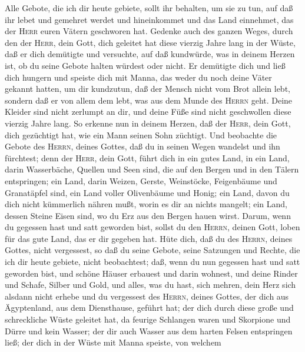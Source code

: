  Alle Gebote, die ich dir heute gebiete, sollt ihr
behalten, um sie zu tun, auf daß ihr lebet und gemehret werdet und
hineinkommet und das Land einnehmet, das der \textsc{Herr} euren Vätern
geschworen hat.  Gedenke auch des ganzen Weges, durch den
der \textsc{Herr}, dein Gott, dich geleitet hat diese vierzig Jahre lang
in der Wüste, daß er dich demütigte und versuchte, auf daß kundwürde,
was in deinem Herzen ist, ob du seine Gebote halten würdest oder nicht.
 Er demütigte dich und ließ dich hungern und speiste dich
mit Manna, das weder du noch deine Väter gekannt hatten, um dir
kundzutun, daß der Mensch nicht vom Brot allein lebt, sondern daß er von
allem dem lebt, was aus dem Munde des \textsc{Herrn} geht.
 Deine Kleider sind nicht zerlumpt an dir, und deine Füße
sind nicht geschwollen diese vierzig Jahre lang.  So
erkenne nun in deinem Herzen, daß der \textsc{Herr}, dein Gott, dich
gezüchtigt hat, wie ein Mann seinen Sohn züchtigt.  Und
beobachte die Gebote des \textsc{Herrn}, deines Gottes, daß du in seinen
Wegen wandelst und ihn fürchtest;  denn der \textsc{Herr},
dein Gott, führt dich in ein gutes Land, in ein Land, darin Wasserbäche,
Quellen und Seen sind, die auf den Bergen und in den Tälern entspringen;
 ein Land, darin Weizen, Gerste, Weinstöcke, Feigenbäume
und Granatäpfel sind, ein Land voller Olivenbäume und Honig;
 ein Land, davon du dich nicht kümmerlich nähren mußt,
worin es dir an nichts mangelt; ein Land, dessen Steine Eisen sind, wo
du Erz aus den Bergen hauen wirst.  Darum, wenn du
gegessen hast und satt geworden bist, sollst du den \textsc{Herrn},
deinen Gott, loben für das gute Land, das er dir gegeben hat.
 Hüte dich, daß du des \textsc{Herrn}, deines Gottes,
nicht vergessest, so daß du seine Gebote, seine Satzungen und Rechte,
die ich dir heute gebiete, nicht beobachtest;  daß, wenn
du nun gegessen hast und satt geworden bist, und schöne Häuser erbauest
und darin wohnest,  und deine Rinder und Schafe, Silber
und Gold, und alles, was du hast, sich mehren,  dein Herz
sich alsdann nicht erhebe und du vergessest des \textsc{Herrn}, deines
Gottes, der dich aus Ägyptenland, aus dem Diensthause, geführt hat;
 der dich durch diese große und schreckliche Wüste
geleitet hat, da feurige Schlangen waren und Skorpione und Dürre und
kein Wasser; der dir auch Wasser aus dem harten Felsen entspringen ließ;
 der dich in der Wüste mit Manna speiste, von welchem
